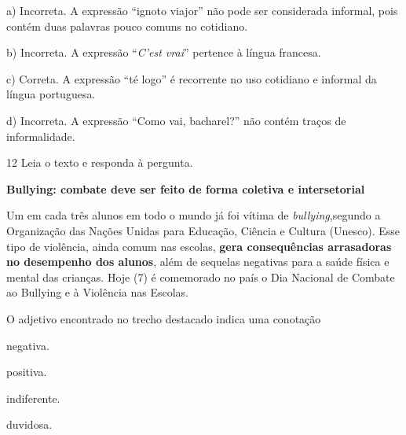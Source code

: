 \begin{escolha}
\begin{escolha}
\begin{escolha}
{a) Incorreta. A expressão ``ignoto viajor'' não pode ser considerada 
informal, pois contém duas palavras pouco comuns no cotidiano.

b) Incorreta. A expressão ``\textit{C'est vrai}'' pertence à língua
francesa.

c) Correta. A expressão ``té logo'' é recorrente no uso cotidiano e 
informal da língua portuguesa.

d) Incorreta. A expressão ``Como vai, bacharel?'' não contém traços
de informalidade.}

\num{12} Leia o texto e responda à pergunta.

\textbf{Bullying: combate deve ser feito de forma coletiva e intersetorial}

Um em cada três alunos em todo o mundo já foi vítima de
\textit{bullying},segundo a Organização das Nações Unidas para Educação,
Ciência e Cultura (Unesco). Esse tipo de violência, ainda comum nas
escolas, \textbf{gera consequências arrasadoras no desempenho dos alunos},
além de sequelas negativas para a saúde física e mental das crianças.
Hoje (7) é comemorado no país o Dia Nacional de Combate ao Bullying e à
Violência nas Escolas.


O adjetivo encontrado no trecho destacado indica uma conotação

\begin{escolha}
  \item negativa.

  \item positiva.

  \item indiferente.

  \item duvidosa.
\end{escolha}

\end{escolha}
\end{escolha}
\end{escolha}
